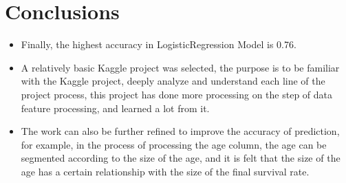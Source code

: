 \section{Conclusions} \label{sec-conclusions}
\begin{itemize}
	\item Finally, the highest accuracy in LogisticRegression Model is 0.76. \\
	
	\item A relatively basic Kaggle project was selected, the purpose is to be familiar with the Kaggle project, deeply analyze and understand each line of the project process, this project has done more processing on the step of data feature processing, and learned a lot from it.
	
	\item The work can also be further refined to improve the accuracy of prediction, for example, in the process of processing the age column, the age can be segmented according to the size of the age, and it is felt that the size of the age has a certain relationship with the size of the final survival rate.
\end{itemize}
